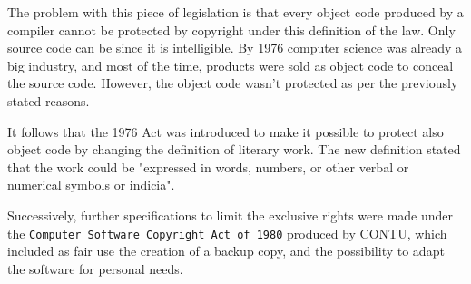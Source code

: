 The problem with this piece of legislation is that every object code produced by a compiler cannot be protected by copyright under this definition of the law. Only source code can be since it is intelligible. By 1976 computer science was already a big industry, and most of the time, products were sold as object code to conceal the source code. However, the object code wasn't protected as per the previously stated reasons.

It follows that the 1976 Act was introduced to make it possible to protect also object code by changing the definition of literary work. The new definition stated that the work could be "expressed in words, numbers, or other verbal or numerical symbols or indicia".

Successively, further specifications to limit the exclusive rights were made under the \texttt{Computer Software Copyright Act of 1980} produced by CONTU, which included as fair use the creation of a backup copy, and the possibility to adapt the software for personal needs.

